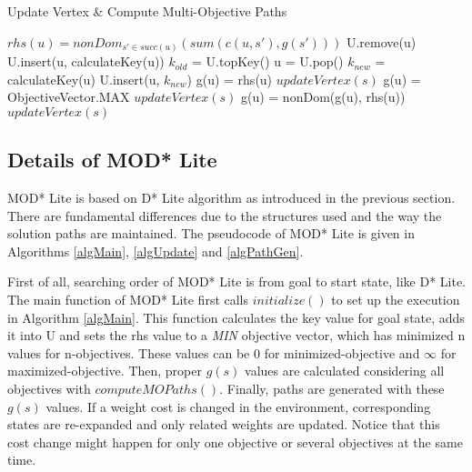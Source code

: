 \begin{algorithm}
	\caption{Update Vertex \& Compute Multi-Objective Paths}
	\label{algUpdate}
    \begin{algorithmic}[1]
   	  		\State $rhs(u) = nonDom_{s' \in succ(u)}(sum(c(u,s'), g(s')))$
   	  	\EndIf
   	  	 U.remove(u) \EndIf
   	  		\State U.insert(u, calculateKey(u))
   	  	\EndIf
   	  \EndFunction
    	  \Statex
			\State $k_{old}$ = U.topKey()
	      	\State u = U.pop()
	      	\State $k_{new}$ = calculateKey(u)
	      		\State U.insert(u, $k_{new}$)
	      		\State g(u) = rhs(u)
	      		 $updateVertex(s)$ \EndFor
	      		\State g(u) = ObjectiveVector.MAX
	      		 $updateVertex(s)$ \EndFor
	      	\Else
	      		\State g(u) = nonDom(g(u), rhs(u))
	      		 $updateVertex(s)$ \EndFor
	      	\EndIf
		\EndWhile
	  \EndFunction
	\end{algorithmic}
\end{algorithm}

\subsection{Details of MOD* Lite}
MOD* Lite is based on  D* Lite algorithm as introduced in the previous section. There are fundamental differences due to the structures used and the way the solution paths are maintained. The pseudocode of MOD* Lite is given in Algorithms \ref{algMain}, \ref{algUpdate} and \ref{algPathGen}.

First of all, searching order of MOD* Lite is from goal to start state, like D* Lite. The main function of MOD* Lite first calls $initialize()$ to set up the execution in Algorithm \ref{algMain}. This function calculates the key value for goal state, adds it into U and sets the rhs value to a \textit{MIN} objective vector, which has minimized n values for n-objectives. These values can be $0$ for minimized-objective and $\infty$ for maximized-objective. Then, proper $g(s)$ values are calculated considering all objectives with $computeMOPaths()$. Finally, paths are generated with these $g(s)$ values. If a weight cost is changed in the environment, corresponding states are re-expanded and only related weights are updated. Notice that this cost change might happen for only one objective or several objectives at the same time.

